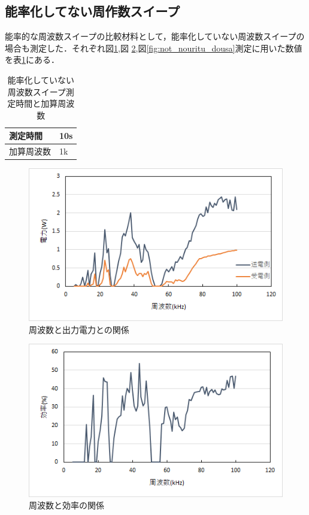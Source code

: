 \documentclass[12pt]{jarticle}
\begin{document}
\subsection{能率化してない周作数スイープ}
能率的な周波数スイープの比較材料として，能率化していない周波数スイープの場合も測定した．それぞれ図\ref{fig:not_nourituw},図 \ref{fig:not_nouritu_kou},図\ref{fig:not_nouritu_dousa}測定に用いた数値を表\ref{tab:not_nouritu}にある．
\begin{table}[H]
	\centering
	\label{tab:not_nouritu}
	\caption{能率化していない周波数スイープ測定時間と加算周波数}
	\begin{tabular}{|l|l|}
		\hline
		測定時間  & 10s \\ \hline
		加算周波数 & 1k  \\ \hline
	\end{tabular}
\end{table}
 \begin{figure}[H]
	\centering
	\includegraphics[]{not_nouritu_w.png}
	\caption{周波数と出力電力との関係}
	\label{fig:not_nourituw}
\end{figure}
\begin{figure}[H]
	\centering
	\includegraphics[]{notkouritu.png}
	\caption{周波数と効率の関係}
	\label{fig:not_nouritu_kou}
\end{figure}
\end{document}
